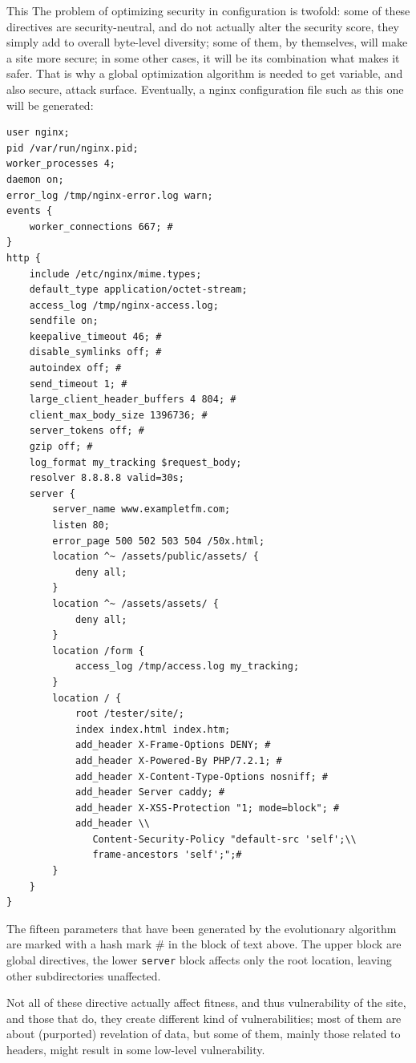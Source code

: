 \documentclass[sigconf]{acmart}
\begin{document}
%
This
The problem of optimizing security in configuration is twofold: some
of these directives are security-neutral, and do not actually alter
the security score, they simply add to overall byte-level diversity;
some of them, by themselves, will make a site more secure; in some
other cases, it will be its combination what makes it safer. That is
why a global optimization algorithm is needed to get variable, and
also secure, attack surface. Eventually, a {\sf nginx} configuration
file such as this one will be generated:

\begin{verbatim}
user nginx;
pid /var/run/nginx.pid;
worker_processes 4;
daemon on;
error_log /tmp/nginx-error.log warn;
events {
    worker_connections 667; #
}
http {
    include /etc/nginx/mime.types;
    default_type application/octet-stream;
    access_log /tmp/nginx-access.log;
    sendfile on;
    keepalive_timeout 46; #
    disable_symlinks off; #
    autoindex off; #
    send_timeout 1; #
    large_client_header_buffers 4 804; #
    client_max_body_size 1396736; #
    server_tokens off; #
    gzip off; #
    log_format my_tracking $request_body;
    resolver 8.8.8.8 valid=30s;
    server {
        server_name www.exampletfm.com;
        listen 80;
        error_page 500 502 503 504 /50x.html;
        location ^~ /assets/public/assets/ {
            deny all;
        }
        location ^~ /assets/assets/ {
            deny all;
        }
        location /form {
            access_log /tmp/access.log my_tracking;
        }
        location / {
            root /tester/site/;
            index index.html index.htm;
            add_header X-Frame-Options DENY; #
            add_header X-Powered-By PHP/7.2.1; #
            add_header X-Content-Type-Options nosniff; #
            add_header Server caddy; #
            add_header X-XSS-Protection "1; mode=block"; #
            add_header \\
               Content-Security-Policy "default-src 'self';\\
               frame-ancestors 'self';";#
        }
    }
}
\end{verbatim}

The fifteen parameters that have been generated by the evolutionary
algorithm are marked with a hash mark \# in the block of text
above. The upper block are global
directives, the lower {\tt server} block  affects only the root location, leaving
other subdirectories unaffected.

Not all of these directive actually affect fitness, and thus
vulnerability of the site, and those that do, they create different
kind of vulnerabilities; most of them are about (purported) revelation
of data, but some of them, mainly those related to headers, might
result in some low-level vulnerability.
\end{document}
